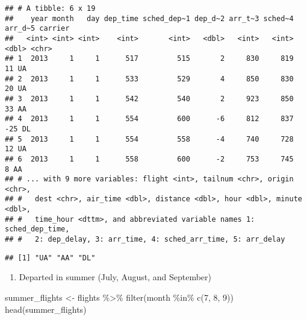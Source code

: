 \documentclass[
]{article}
\newenvironment{Shaded}{\begin{snugshade}}{\end{snugshade}}
\newcommand{\DecValTok}[1]{\textcolor[rgb]{0.00,0.00,0.81}{#1}}
\newcommand{\FunctionTok}[1]{\textcolor[rgb]{0.00,0.00,0.00}{#1}}
\newcommand{\NormalTok}[1]{#1}
\newcommand{\OtherTok}[1]{\textcolor[rgb]{0.56,0.35,0.01}{#1}}
\newcommand{\SpecialCharTok}[1]{\textcolor[rgb]{0.00,0.00,0.00}{#1}}
\providecommand{\tightlist}{%
  \setlength{\itemsep}{0pt}\setlength{\parskip}{0pt}}
\begin{document}
\begin{verbatim}
## # A tibble: 6 x 19
##    year month   day dep_time sched_dep~1 dep_d~2 arr_t~3 sched~4 arr_d~5 carrier
##   <int> <int> <int>    <int>       <int>   <dbl>   <int>   <int>   <dbl> <chr>  
## 1  2013     1     1      517         515       2     830     819      11 UA     
## 2  2013     1     1      533         529       4     850     830      20 UA     
## 3  2013     1     1      542         540       2     923     850      33 AA     
## 4  2013     1     1      554         600      -6     812     837     -25 DL     
## 5  2013     1     1      554         558      -4     740     728      12 UA     
## 6  2013     1     1      558         600      -2     753     745       8 AA     
## # ... with 9 more variables: flight <int>, tailnum <chr>, origin <chr>,
## #   dest <chr>, air_time <dbl>, distance <dbl>, hour <dbl>, minute <dbl>,
## #   time_hour <dttm>, and abbreviated variable names 1: sched_dep_time,
## #   2: dep_delay, 3: arr_time, 4: sched_arr_time, 5: arr_delay
\end{verbatim}

\begin{Shaded}
\end{Shaded}

\begin{verbatim}
## [1] "UA" "AA" "DL"
\end{verbatim}

\begin{enumerate}
\def\labelenumi{\alph{enumi})}
\setcounter{enumi}{3}
\tightlist
\item
  Departed in summer (July, August, and September)
\end{enumerate}

\begin{Shaded}
\begin{Highlighting}[]
\NormalTok{summer\_flights }\OtherTok{\textless{}{-}}\NormalTok{ flights }\SpecialCharTok{\%\textgreater{}\%} \FunctionTok{filter}\NormalTok{(month }\SpecialCharTok{\%in\%} \FunctionTok{c}\NormalTok{(}\DecValTok{7}\NormalTok{, }\DecValTok{8}\NormalTok{, }\DecValTok{9}\NormalTok{))}
\FunctionTok{head}\NormalTok{(summer\_flights)}
\end{Highlighting}
\end{Shaded}
\end{document}
